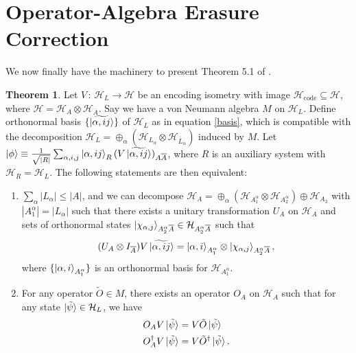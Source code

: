 \documentclass[12pt,a4paper]{report}
\numberwithin{equation}{section}
\newcommand{\Hcode}{\mathcal{H}_{\text{code}}}
\newcommand{\ol}[1]{\overline{#1}}
\theoremstyle{definition}
\theoremstyle{theorem}
\newtheorem{theorem}{Theorem}[section]
\theoremstyle{theorem}
\theoremstyle{example}
\theoremstyle{definition}
\begin{document}
\section{Operator-Algebra Erasure Correction}
We now finally have the machinery to present Theorem 5.1 of \cite{Harlow}.
\begin{theorem}\label{5.1}
	Let $V\,:\,\mathcal{H}_{L}\to \mathcal{H}$ be an encoding isometry with image $\Hcode\subseteq\mathcal{H}$, where $\mathcal{H}=\mathcal{H}_{A}\otimes\mathcal{H}_{\ol{A}}$. Say we have a von Neumann algebra $M$ on $\mathcal{H}_{L}$. Define orthonormal basis $\{\ket{\widetilde{\alpha,ij}}\}$ of $\mathcal{H}_{L}$ as in equation \ref{basis}, which is compatible with the decomposition $\mathcal{H}_{L}=\oplus_{\alpha}(\mathcal{H}_{L_{\alpha}}\otimes\mathcal{H}_{\ol{L}_{\alpha}})$ induced by $M$. Let $\ket{\phi}\equiv\frac{1}{\sqrt{|R|}}\sum_{\alpha,i,j}\ket{\alpha,ij}_{R}(V\ket{\widetilde{\alpha,ij}})_{A\ol{A}}$, where $R$ is an auxiliary system with $\mathcal{H}_{R}=\mathcal{H}_{L}$. The following statements are then equivalent:
	\begin{enumerate}
		\item \label{o1} $\sum_{\alpha}|L_{\alpha}|\leq|A|$, and we can decompose $\mathcal{H}_{A}=\oplus_{\alpha}(\mathcal{H}_{A_{1}^{\alpha}}\otimes\mathcal{H}_{A_{2}^{\alpha}})\oplus\mathcal{H}_{A_{3}}$ with $|A_{1}^{\alpha}|=|L_{\alpha}|$ such that there exists a unitary transformation $U_{A}$ on $\mathcal{H}_{A}$ and sets of orthonormal states $\ket{\chi_{\alpha,j}}_{A_{2}^{\alpha}\ol{A}}\in\mathcal{H}_{A_{2}^{\alpha}\ol{A}}$ such that
		\begin{equation}\label{O1}
			(U_{A}\otimes I_{\ol{A}})V\ket{\widetilde{\alpha,ij}}=\ket{\alpha,i}_{A_{1}^{\alpha}}\otimes\ket{\chi_{\alpha,j}}_{A_{2}^{\alpha}\ol{A}},
		\end{equation}
		where $\{\ket{\alpha,i}_{A_{1}^{\alpha}}\}$ is an orthonormal basis for $\mathcal{H}_{A_{1}^{\alpha}}$.
		\item \label{o2} For any operator $\tilde{O}\in M$, there exists an operator $O_{A}$ on $\mathcal{H}_{A}$ such that for any state $\ket{\tilde{\psi}}\in\mathcal{H}_{L}$, we have
		\begin{equation}\label{O2}
			\begin{aligned}
				O_{A}V\ket{\tilde{\psi}}&=V\tilde{O}\ket{\tilde{\psi}}\\
				O_{A}^{\dagger}V\ket{\tilde{\psi}}&=V\tilde{O}^{\dagger}\ket{\tilde{\psi}}.
			\end{aligned}
		\end{equation}

\end{enumerate}
\end{theorem}
\end{document}
